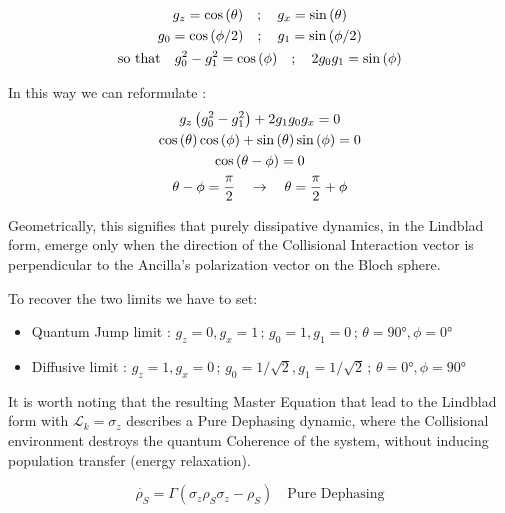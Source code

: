 \documentclass[a4paper,12pt]{article}
\begin{document}
	\begin{gather}
		g_z = \cos{(\theta)} \quad ; \quad g_x = \sin{(\theta)} \label{eq:gz_gx_geom_def} \\
		g_0 = \cos{(\phi/2)} \quad ; \quad g_1 = \sin{(\phi/2)} \label{eq:g0_g1_geom_def} \\
		\text{so that} \quad g_0^2 - g_1^2 = \cos{(\phi)} \quad ; \quad 2g_0g_1 = \sin{(\phi)} \notag
	\end{gather}

	In this way we can reformulate :
	\begin{gather}
		g_{z}\left(g_{0}^{2} - g_{1}^{2} \right) + 2 g_{1} g_{0} g_{x} = 0 \notag \\
		\cos{(\theta)}\cos{(\phi)} + \sin{(\theta)}\sin{(\phi)} = 0 \notag \\
		\cos{(\theta - \phi)} = 0 \notag \\
		\theta - \phi = \frac{\pi}{2} \quad \rightarrow \quad \theta = \frac{\pi}{2} + \phi
		\label{eq:g_equivalnce_geom_sol}
	\end{gather}

	Geometrically, this signifies that purely dissipative dynamics, in the Lindblad form, emerge only when the direction of the Collisional Interaction vector is perpendicular to the Ancilla's polarization vector on the Bloch sphere.

	\newpage

	To recover the two limits we have to set:

	\begin{itemize}
		\item Quantum Jump limit : $ g_z = 0 , g_x = 1 \, ; \, g_0 = 1 , g_1 = 0 \, ; \, \theta = 90° , \phi = 0° $
		\item Diffusive limit : $ g_z = 1 , g_x = 0 \, ; \, g_0 = 1/\sqrt{2} , g_1 = 1/\sqrt{2} \, ; \, \theta = 0° , \phi = 90° $
	\end{itemize}

	It is worth noting that the resulting Master Equation that lead to the Lindblad form with $ \mathcal{L}_k = \sigma_{z} $ describes a Pure Dephasing dynamic, where the Collisional environment destroys the quantum Coherence of the system, without inducing population transfer (energy relaxation).

	\begin{equation}
		\dot{\rho_S} = \Gamma \left(\sigma_{z} \rho_S \sigma_{z} - \rho_S \right) \quad \text{Pure Dephasing}
		\label{eq:lindblad_pure_deph_recover}
	\end{equation}
\end{document}
